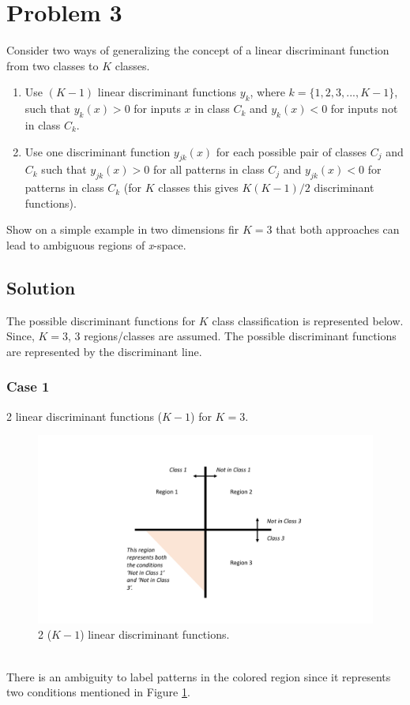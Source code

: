 \documentclass{article}
\begin{document}
\section{Problem 3}
Consider two ways of generalizing the concept of a linear discriminant function from two classes to $K$ classes.
\begin{enumerate}
\item Use $(K-1)$ linear discriminant functions $y_k$, where $k = \{1,2,3,...,K-1\}$, such that $y_k(x) > 0$ for inputs $x$ in class $C_k$ and $y_k(x) < 0$ for inputs not in class $C_k$.

\item Use one discriminant function $y_{jk}(x)$ for each possible pair of classes $C_j$ and $C_k$ such that $y_{jk}(x)> 0$ for all patterns in class $C_j$ and $y_{jk}(x) < 0$ for patterns in class $C_k$ (for $K$ classes this gives $K(K-1)/2$ discriminant functions).  
\end{enumerate}
Show on a simple example in two dimensions fir $K=3$ that both approaches can lead to ambiguous regions of \textit{x}-space.

\subsection{Solution}
The possible discriminant functions for $K$ class classification is represented below. Since, $K=3$, 3 regions/classes are assumed. The possible discriminant functions are represented by the discriminant line.
\subsubsection{Case 1}
2 linear discriminant functions ($K-1$) for $K=3$.
\begin{figure}[htpb]
    \centering
    \includegraphics[scale = 0.5]{first_condition.pdf}
    \caption{2 ($K-1$) linear discriminant functions.}
 \label{fig:case1}
 \end{figure}
\\
There is an ambiguity to label patterns in the colored region since it represents two conditions mentioned in Figure \ref{fig:case1}.
\end{document}
